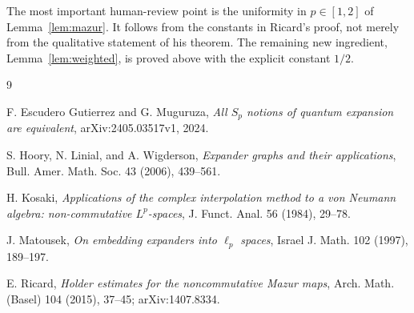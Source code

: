 \documentclass[11pt]{article}
\begin{document}
The most important human-review point is the uniformity in $p\in[1,2]$
of Lemma~\ref{lem:mazur}.  It follows from the constants in Ricard's proof,
not merely from the qualitative statement of his theorem.  The remaining
new ingredient, Lemma~\ref{lem:weighted}, is proved above with the explicit
constant $1/2$.

\begin{thebibliography}{9}

F. Escudero Gutierrez and G. Muguruza,
\emph{All $S_p$ notions of quantum expansion are equivalent},
arXiv:2405.03517v1, 2024.

S. Hoory, N. Linial, and A. Wigderson,
\emph{Expander graphs and their applications},
Bull. Amer. Math. Soc. 43 (2006), 439--561.

H. Kosaki,
\emph{Applications of the complex interpolation method to a von Neumann
algebra: non-commutative $L^p$-spaces},
J. Funct. Anal. 56 (1984), 29--78.

J. Matousek,
\emph{On embedding expanders into $\ell_p$ spaces},
Israel J. Math. 102 (1997), 189--197.

E. Ricard,
\emph{Holder estimates for the noncommutative Mazur maps},
Arch. Math. (Basel) 104 (2015), 37--45; arXiv:1407.8334.

\end{thebibliography}
\end{document}
